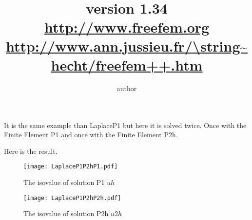 \documentclass[twoside]{book}
\title{
\DeclareFixedFont{\TitreFont}{\encodingdefault}{pnc}{r}{\shapedefault}{80pt}
 {\Blue{ \TitreFont Freefem++ \\ \vglue 1cm  Manual}} \\ \vglue 5cm  ~ \\  
      \normalsize  { version 1.34  \Red{(Under construction)} }
 \\ \vglue 1cm
 \Large \url{http://www.freefem.org} \\
\url{http://www.ann.jussieu.fr/\string~hecht/freefem++.htm} 
}
\author{author}
\newif\ifpdf
\begin{document}
\graphicspath{{./}{plots/}}
\ifpdf
\DeclareGraphicsExtensions{.pdf, .jpg, .tif, .eps, .ps}
\else
{}
\fi
\maketitle
\tableofcontents
\let\subsubsection\subsection
\let\subsection\section
\let\section\chapter

\huge

It is the same example than LaplaceP1 but here it is solved twice.
Once with the Finite Element P1 and once with the Finite Element P2h.

Here is the result.

\begin{figure}[htbp]
	\begin{center}
		\texttt{[image: LaplaceP1P2hP1.pdf]}
	\end{center}
	\caption{The isovalue of solution P1 $uh$}
\end{figure}

\begin{figure}[htbp]
	\begin{center}
		\texttt{[image: LaplaceP1P2hP2h.pdf]}
	\end{center}
	\caption{The isovalue of solution P2h $u2h$}
\end{figure}
\end{document}
